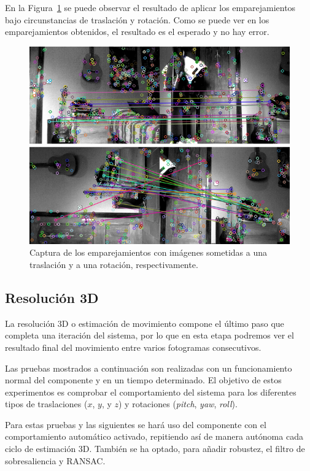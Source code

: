 En la Figura~\ref{fig:matching-rt} se puede observar el resultado de aplicar los emparejamientos bajo circunstancias de traslación y rotación. Como se puede ver en los emparejamientos obtenidos, el resultado es el esperado y no hay error.

\begin{figure}[th]
\centering
\includegraphics[scale=0.6]{Figures/tests/matching-rt.png}
\decoRule
\caption[Captura con los emparejamientos con imágenes sometidas a una rotación y a una traslación]{Captura de los emparejamientos con imágenes sometidas a una traslación y a una rotación, respectivamente.}
\label{fig:matching-rt}
\end{figure}

\subsection{Resolución 3D}

La resolución 3D o estimación de movimiento compone el último paso que completa una iteración del sistema, por lo que en esta etapa podremos ver el resultado final del movimiento entre varios fotogramas consecutivos.

Las pruebas mostrados a continuación son realizadas con un funcionamiento normal del componente y en un tiempo determinado. El objetivo de estos experimentos es comprobar el comportamiento del sistema para los diferentes tipos de traslaciones ($x$, $y$, y $z$) y rotaciones (\textit{pitch}, \textit{yaw}, \textit{roll}).

Para estas pruebas y las siguientes se hará uso del componente con el comportamiento automático activado, repitiendo así de manera autónoma cada ciclo de estimación 3D. También se ha optado, para añadir robustez, el filtro de sobresaliencia y RANSAC.

